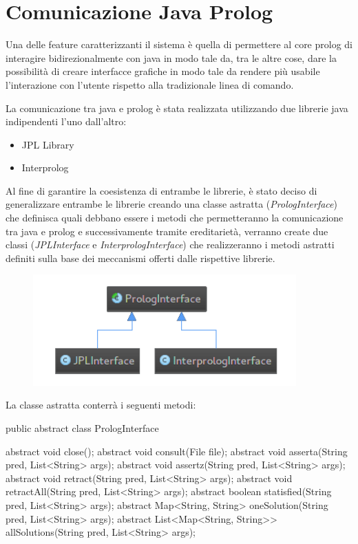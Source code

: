\section{Comunicazione Java Prolog}
\label{java-prolog}
Una delle feature caratterizzanti il sistema è quella di permettere al core prolog di interagire bidirezionalmente con java in modo tale da, tra le altre cose, dare la possibilità di creare interfacce grafiche in modo tale da rendere più usabile l'interazione con l'utente rispetto alla tradizionale linea di comando.

La comunicazione tra java e prolog è stata realizzata utilizzando due librerie java indipendenti l'uno dall'altro:
\begin{itemize}
	\item JPL Library
	\item Interprolog
\end{itemize}
Al fine di garantire la coesistenza di entrambe le librerie, è stato deciso di generalizzare entrambe le librerie creando una classe astratta (\emph{PrologInterface}) che definisca quali debbano essere i metodi che permetteranno la comunicazione tra java e prolog e successivamente tramite ereditarietà, verranno create due classi (\emph{JPLInterface} e \emph{InterprologInterface}) che realizzeranno i metodi astratti definiti sulla base dei meccanismi offerti dalle rispettive librerie.

\begin{figure}[H]
	\centering
	\includegraphics[width=0.9\textwidth]{img/prologInterface.png}
\end{figure}

La classe astratta conterrà i seguenti metodi:

\begin{javacode}
public abstract class PrologInterface {

  abstract void close();
  abstract void consult(File file);
  abstract void asserta(String pred, List<String> args);
  abstract void assertz(String pred, List<String> args);
  abstract void retract(String pred, List<String> args);
  abstract void retractAll(String pred, List<String> args);
  abstract boolean statisfied(String pred, List<String> args);
  abstract Map<String, String> oneSolution(String pred, List<String> args);
  abstract List<Map<String, String>> allSolutions(String pred, List<String> args);
}
\end{javacode}

